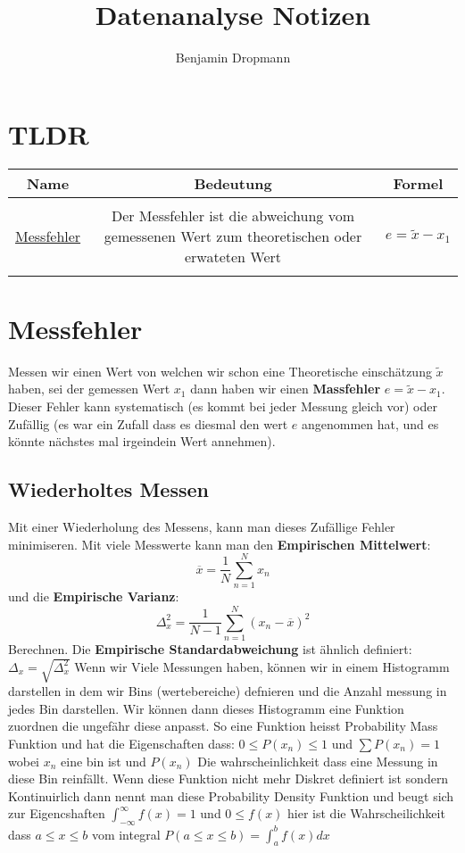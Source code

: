 \documentclass{article}
\title{Datenanalyse Notizen}
\author{Benjamin Dropmann}
\begin{document}
\maketitle
\section{TLDR}
\begin{tabular}{c|c|c}
  \textbf{Name}&\textbf{Bedeutung}&\textbf{Formel}\\
  \hline\\
\hyperlink{messfehler}{Messfehler}&Der Messfehler ist die abweichung vom gemessenen Wert zum theoretischen oder erwateten Wert&$e=\tilde{x}-x_1 $
\hline\\
\hyperlink{}
\end{tabular}
\hypertarget{messfehler}{\section{Messfehler}}
{Messen} wir einen Wert von welchen wir schon eine Theoretische einschätzung $\tilde{x}$ haben, sei der gemessen Wert $x_1$ dann haben wir einen \textbf{Massfehler} $e=\tilde{x}-x_1$.
Dieser Fehler kann systematisch (es kommt bei jeder Messung gleich vor) oder Zufällig (es war ein Zufall dass es diesmal den wert $e$ angenommen hat, und es könnte nächstes mal irgeindein Wert annehmen).
\subsection{Wiederholtes Messen}
Mit einer Wiederholung des Messens, kann man dieses Zufällige Fehler minimiseren. Mit viele Messwerte kann man den \textbf{Empirischen Mittelwert}:
\[\overline{x}=\frac{1}{N}\sum_{n=1}^N x_n\] und die \textbf{Empirische Varianz}:\[\Delta_x^2=\frac{1}{N-1}\sum_{n=1}^N(x_n-\overline{x})^2\]Berechnen. Die \textbf{Empirische Standardabweichung} ist ähnlich definiert: $\Delta_x=\sqrt{\Delta_x^2}$
\newline Wenn wir Viele Messungen haben, können wir in einem Histogramm darstellen in dem wir Bins (wertebereiche) defnieren und die Anzahl messung in jedes Bin darstellen.
Wir können dann dieses Histogramm eine Funktion zuordnen die ungefähr diese anpasst. So eine Funktion heisst Probability Mass Funktion und hat die Eigenschaften dass: $0\le P(x_n)\le 1$ und $\sum P(x_n)=1$ wobei $x_n$ eine bin ist und $P(x_n)$ Die wahrscheinlichkeit dass eine Messung in diese Bin reinfällt.
Wenn diese Funktion nicht mehr Diskret definiert ist sondern Kontinuirlich dann nennt man diese Probability Density Funktion und beugt sich zur Eigencshaften $\int_{-\infty}^\infty f(x)=1$ und $0\le f(x)$ hier ist die Wahrscheilichkeit dass $a\le x\le b$ vom integral $P(a\le x\le b)=\int_a^b f(x) dx$
\end{document}
